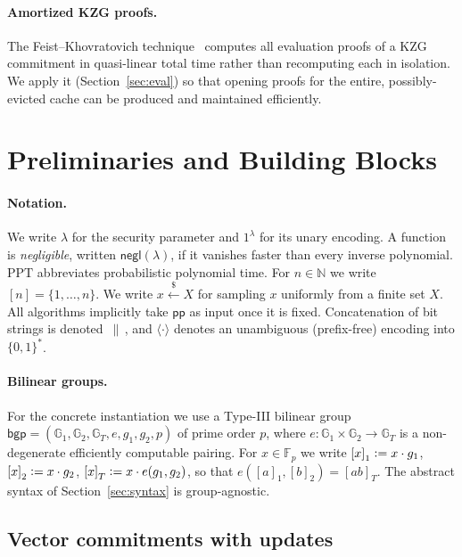\documentclass[version=submission]{iacrcc}
\theoremstyle{definition}
\newcommand{\secpar}{\lambda}
\newcommand{\negl}{\mathsf{negl}}
\newcommand{\PPT}{\mathrm{PPT}}
\newcommand{\bit}{\{0,1\}}
\newcommand{\sample}{\xleftarrow{\;\$\;}}
\newcommand{\defeq}{\vcentcolon=}
\newcommand{\concat}{\,\|\,}
\newcommand{\pp}{\mathsf{pp}}
\newcommand{\GG}{\mathbb{G}}
\newcommand{\FF}{\mathbb{F}}
\newcommand{\gone}[1]{\left[#1\right]_{1}}
\newcommand{\gtwo}[1]{\left[#1\right]_{2}}
\newcommand{\gtt}[1]{\left[#1\right]_{T}}
\begin{document}
\paragraph{Amortized KZG proofs.}
The Feist--Khovratovich technique~\cite{fk} computes all evaluation proofs of a
KZG commitment in quasi-linear total time rather than recomputing each in
isolation. We apply it (Section~\ref{sec:eval}) so that opening proofs for the
entire, possibly-evicted cache can be produced and maintained efficiently.

\section{Preliminaries and Building Blocks}\label{sec:prelim}

\paragraph{Notation.}
We write $\secpar$ for the security parameter and $1^\secpar$ for its unary
encoding. A function is \emph{negligible}, written $\negl(\secpar)$, if it
vanishes faster than every inverse polynomial. $\PPT$ abbreviates probabilistic
polynomial time. For $n\in\mathbb{N}$ we write $[n]=\{1,\dots,n\}$. We write
$x\sample X$ for sampling $x$ uniformly from a finite set $X$. All algorithms
implicitly take $\pp$ as input once it is fixed. Concatenation of bit strings is
denoted $\concat$, and $\langle\cdot\rangle$ denotes an unambiguous (prefix-free)
encoding into $\bit^{*}$.

\paragraph{Bilinear groups.}
For the concrete instantiation we use a Type-III bilinear group
$\mathsf{bgp}=(\GG_1,\GG_2,\GG_T,e,g_1,g_2,p)$ of prime order $p$, where
$e:\GG_1\times\GG_2\to\GG_T$ is a non-degenerate efficiently computable pairing.
For $x\in\FF_p$ we write $\gone{x}\defeq x\cdot g_1$, $\gtwo{x}\defeq x\cdot g_2$,
$\gtt{x}\defeq x\cdot e(g_1,g_2)$, so that $e(\gone{a},\gtwo{b})=\gtt{ab}$. The
abstract syntax of Section~\ref{sec:syntax} is group-agnostic.

\subsection{Vector commitments with updates}
\end{document}
